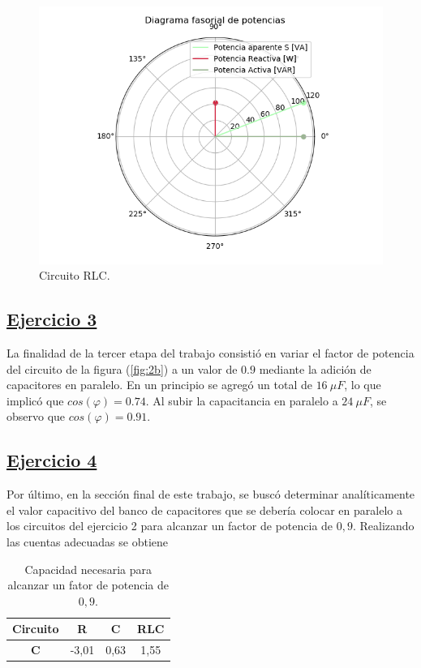 \documentclass[a4paper]{article}
\begin{document}
\begin{figure}[H]
\begin{minipage}{.5\textwidth}
\end{minipage}\\
\begin{minipage}{.5\textwidth}
  \centering
  \includegraphics[width=1.2\linewidth]{Diag-Fas-2C}
  \caption{Circuito RLC.}
\end{minipage}
\end{figure}

\newpage

\subsection*{\underline{Ejercicio 3}}
La finalidad de la tercer etapa del trabajo consistió en variar el factor de potencia del circuito de la figura (\ref{fig:2b}) a un valor de $ 0.9 $ mediante la adición de capacitores en paralelo. En un principio se agregó un total de $ 16 \ \mu F$, lo que implicó que $ cos \left(\varphi \right) = 0.74 $. Al subir la capacitancia en paralelo a $ 24 \ \mu F$, se observo que $ cos \left(\varphi \right) = 0.91 $.

\subsection*{\underline{Ejercicio 4}}
Por último, en la sección final de este trabajo, se buscó determinar analíticamente el valor capacitivo del banco de capacitores que se debería colocar en paralelo a los circuitos del ejercicio 2 para alcanzar un factor de potencia de $ 0,9 $. Realizando las cuentas adecuadas se obtiene
\begin{table}[H]
\centering
\begin{tabular}{|c|c|c|c|}
\hline
\textbf{Circuito} & \textbf{R} & \textbf{C} & \textbf{RLC} \\ \hline
\textbf{C}        & -3,01      & 0,63       & 1,55         \\ \hline
\end{tabular}
\caption{Capacidad necesaria para alcanzar un fator de potencia de $ 0,9 $.}
\end{table}
\end{document}
